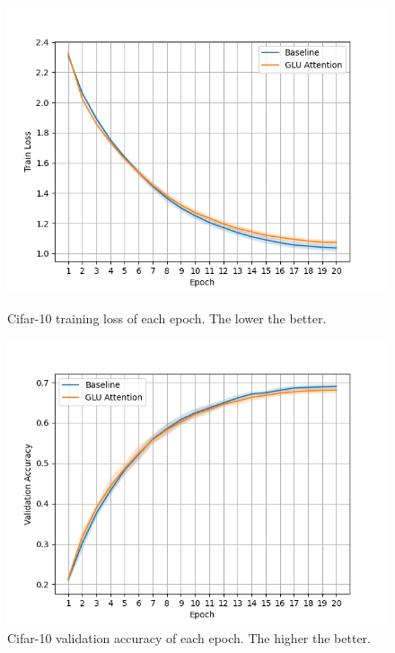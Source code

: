 \documentclass[11pt]{article}
\begin{document}
\begin{figure}[htbp]
    \centering
    \begin{minipage}{0.49\textwidth}
        \centering
        \includegraphics[width=\textwidth]{cifar10_train_loss.png}
        \caption{Cifar-10 training loss of each epoch. The lower the better.}
        \label{fig:cifar10_train_loss}
    \end{minipage}
    \hfill
    \begin{minipage}{0.49\textwidth}
        \centering
        \includegraphics[width=\textwidth]{cifar10_val_acc.png}
        \caption{Cifar-10 validation accuracy of each epoch. The higher the better.}
        \label{fig:cifar10_val_acc}
    \end{minipage}
\end{figure}
\end{document}
